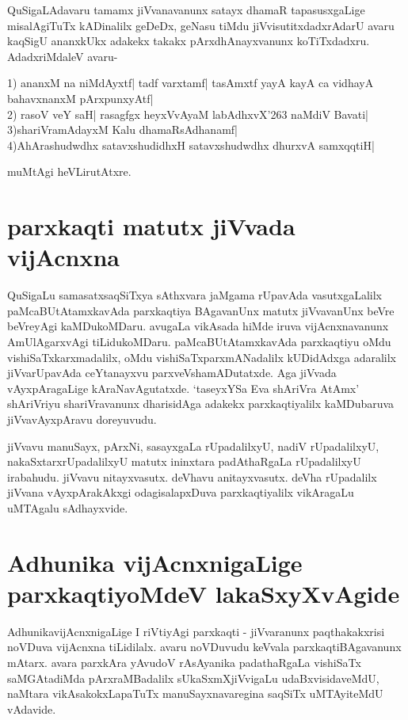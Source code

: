 QuSigaLAdavaru tamamx jiVvanavanunx satayx dhamaR tapasusxgaLige misalAgiTuTx kADinalilx geDeDx, geNasu tiMdu jiVvisutitxdadxrAdarU avaru kaqSigU ananxkUkx adakekx takakx pArxdhAnayxvanunx koTiTxdadxru. AdadxriMdaleV avaru-

1) ananxM na niMdAyxtf|\label{76} tadf varxtamf| tasAmxtf yayA kayA ca vidhayA bahavxnanxM pArxpunxyAtf|\\
2) rasoV veY saH| rasagfgx heyxVvAyaM labAdhxvX\char'263 naMdiV Bavati|\label{76c}\\
3)shariVramAdayxM Kalu dhamaRsAdhanamf|\label{76d}\\
4)AhArashudwdhx satavxshudidhxH satavxshudwdhx dhurxvA samxqqtiH|\label{76b}

muMtAgi heVLirutAtxre.

\section*{parxkaqti matutx jiVvada vijAcnxna}

QuSigaLu samasatxsaqSiTxya sAthxvara jaMgama rUpavAda vasutxgaLalilx paMcaBUtAtamxkavAda parxkaqtiya BAgavanUnx matutx jiVvavanUnx beVre beVreyAgi kaMDukoMDaru. avugaLa vikAsada hiMde iruva vijAcnxnavanunx AmUlAgarxvAgi tiLidukoMDaru. paMcaBUtAtamxkavAda parxkaqtiyu oMdu vishiSaTxkarxmadalilx, oMdu vishiSaTxparxmANadalilx kUDidAdxga adaralilx jiVvarUpavAda ceYtanayxvu parxveVshamADutatxde. Aga jiVvada vAyxpAragaLige kAraNavAgutatxde. `taseyxYSa Eva shAriVra AtAmx'\label{76a} shAriVriyu shariVravanunx dharisidAga adakekx  parxkaqtiyalilx kaMDubaruva jiVvavAyxpAravu doreyuvudu.

jiVvavu manuSayx, pArxNi, sasayxgaLa rUpadalilxyU, nadiV rUpadalilxyU, nakaSxtarxrUpadalilxyU matutx ininxtara padAthaRgaLa rUpadalilxyU irabahudu. jiVvavu nitayxvasutx. deVhavu anitayxvasutx. deVha rUpadalilx jiVvana vAyxpArakAkxgi odagisalapxDuva parxkaqtiyalilx vikAragaLu uMTAgalu sAdhayxvide.

\section*{Adhunika vijAcnxnigaLige parxkaqtiyoMdeV lakaSxyXvAgide}

AdhunikavijAcnxnigaLige I riVtiyAgi parxkaqti - jiVvaranunx paqthakakxrisi noVDuva vijAcnxna tiLidilalx. avaru noVDuvudu keVvala parxkaqtiBAgavanunx mAtarx. avara parxkAra yAvudoV rAsAyanika padathaRgaLa vishiSaTx saMGAtadiMda pArxraMBadalilx sUkaSxmXjiVvigaLu udaBxvisidaveMdU, naMtara vikAsakokxLapaTuTx manuSayxnavaregina saqSiTx uMTAyiteMdU vAdavide.

